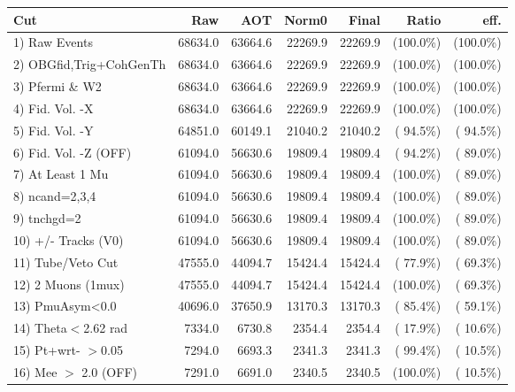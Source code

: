  \begin{table}[h!]\centering
 \begin{tabular}{||l||r|r|r|r|r|r||}
 \hline
 \hline
 Cut & Raw & AOT & Norm0 & Final & Ratio & eff.       \\
 \hline
  1) Raw Events           &      68634.0 &      63664.6 &      22269.9 &      22269.9 & (100.0\%) & (100.0\%) \\
  2) OBGfid,Trig+CohGenTh &      68634.0 &      63664.6 &      22269.9 &      22269.9 & (100.0\%) & (100.0\%) \\
  3) Pfermi \& W2         &      68634.0 &      63664.6 &      22269.9 &      22269.9 & (100.0\%) & (100.0\%) \\
  4) Fid. Vol. -X         &      68634.0 &      63664.6 &      22269.9 &      22269.9 & (100.0\%) & (100.0\%) \\
  5) Fid. Vol. -Y         &      64851.0 &      60149.1 &      21040.2 &      21040.2 & ( 94.5\%) & ( 94.5\%) \\
  6) Fid. Vol. -Z (OFF)   &      61094.0 &      56630.6 &      19809.4 &      19809.4 & ( 94.2\%) & ( 89.0\%) \\
  7) At Least 1 Mu        &      61094.0 &      56630.6 &      19809.4 &      19809.4 & (100.0\%) & ( 89.0\%) \\
  8) ncand=2,3,4          &      61094.0 &      56630.6 &      19809.4 &      19809.4 & (100.0\%) & ( 89.0\%) \\
  9) tnchgd=2             &      61094.0 &      56630.6 &      19809.4 &      19809.4 & (100.0\%) & ( 89.0\%) \\
 10) +/- Tracks (V0)      &      61094.0 &      56630.6 &      19809.4 &      19809.4 & (100.0\%) & ( 89.0\%) \\
 11) Tube/Veto Cut        &      47555.0 &      44094.7 &      15424.4 &      15424.4 & ( 77.9\%) & ( 69.3\%) \\
 12) 2 Muons (1mux)       &      47555.0 &      44094.7 &      15424.4 &      15424.4 & (100.0\%) & ( 69.3\%) \\
 13) PmuAsym<0.0          &      40696.0 &      37650.9 &      13170.3 &      13170.3 & ( 85.4\%) & ( 59.1\%) \\
 14) Theta$<$2.62 rad     &       7334.0 &       6730.8 &       2354.4 &       2354.4 & ( 17.9\%) & ( 10.6\%) \\
 15) Pt+wrt- $>$0.05      &       7294.0 &       6693.3 &       2341.3 &       2341.3 & ( 99.4\%) & ( 10.5\%) \\
 16) Mee $>$ 2.0  (OFF)   &       7291.0 &       6691.0 &       2340.5 &       2340.5 & (100.0\%) & ( 10.5\%) \\

\end{tabular}
\end{table}
